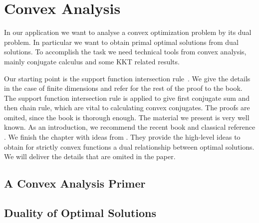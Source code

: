 \documentclass[11pt, a4paper, BCOR=10mm, DIV=11]{scrbook}
\theoremstyle{definition}
\theoremstyle{plain}
\begin{document}
\chapter{Convex Analysis}
In our application we want to analyse a convex optimization problem by its dual problem.
In particular we want to obtain primal optimal solutions from dual solutions.
To accomplish the task we need technical tools from convex analysis, 
mainly conjugate calculus and some KKT related results.

Our starting point is 
the support function intersection rule~\cite[Theorem 4.23]{Mordukhovich2022}.
We give the details in the case of finite dimensions and refer for the rest of the proof to the book.
The support function intersection rule is applied to give first conjugate sum and then chain rule,
which are vital to calculating convex conjugates. The proofs are omited, since the book is thorough enough. 
The material we present is very well known.
As an introduction, we recommend the recent book \cite{Mordukhovich2022} and classical reference \cite{Rockafellar1970}.
We finish the chapter with ideas from \cite{Tseng1991}. 
They provide the high-level ideas to obtain for strictly convex
functions a dual relationship between optimal solutions.
We will deliver the details that are omited in the paper.
  \section{A Convex Analysis Primer}
  
%
  \section{Duality of Optimal Solutions}
  
\end{document}
